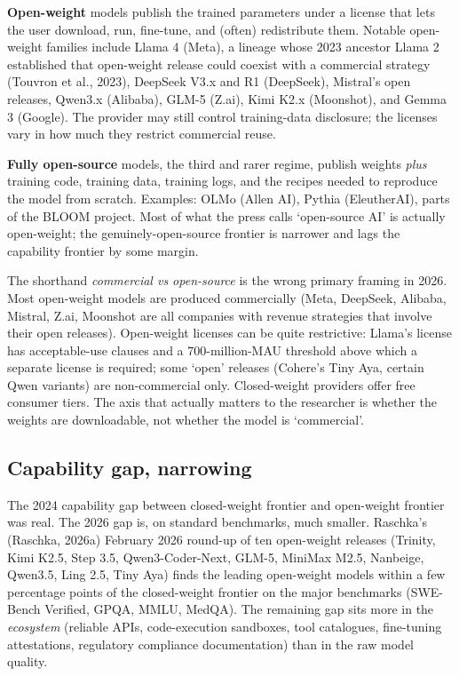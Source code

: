\documentclass[
  letterpaper,
  11pt]{scrbook}
\begin{document}
\textbf{Open-weight} models publish the trained parameters under a
license that lets the user download, run, fine-tune, and (often)
redistribute them. Notable open-weight families include Llama 4 (Meta),
a lineage whose 2023 ancestor Llama 2 established that open-weight
release could coexist with a commercial strategy ({Touvron et al.},
2023), DeepSeek V3.x and R1 (DeepSeek), Mistral's open releases, Qwen3.x
(Alibaba), GLM-5 (Z.ai), Kimi K2.x (Moonshot), and Gemma 3 (Google). The
provider may still control training-data disclosure; the licenses vary
in how much they restrict commercial reuse.

\textbf{Fully open-source} models, the third and rarer regime, publish
weights \emph{plus} training code, training data, training logs, and the
recipes needed to reproduce the model from scratch. Examples: OLMo
(Allen AI), Pythia (EleutherAI), parts of the BLOOM project. Most of
what the press calls `open-source AI' is actually open-weight; the
genuinely-open-source frontier is narrower and lags the capability
frontier by some margin.

The shorthand \emph{commercial vs open-source} is the wrong primary
framing in 2026. Most open-weight models are produced commercially
(Meta, DeepSeek, Alibaba, Mistral, Z.ai, Moonshot are all companies with
revenue strategies that involve their open releases). Open-weight
licenses can be quite restrictive: Llama's license has acceptable-use
clauses and a 700-million-MAU threshold above which a separate license
is required; some `open' releases (Cohere's Tiny Aya, certain Qwen
variants) are non-commercial only. Closed-weight providers offer free
consumer tiers. The axis that actually matters to the researcher is
whether the weights are downloadable, not whether the model is
`commercial'.

\subsection{Capability gap, narrowing}\label{capability-gap-narrowing}

The 2024 capability gap between closed-weight frontier and open-weight
frontier was real. The 2026 gap is, on standard benchmarks, much
smaller. Raschka's (Raschka, 2026a) February 2026 round-up of ten
open-weight releases (Trinity, Kimi K2.5, Step 3.5, Qwen3-Coder-Next,
GLM-5, MiniMax M2.5, Nanbeige, Qwen3.5, Ling 2.5, Tiny Aya) finds the
leading open-weight models within a few percentage points of the
closed-weight frontier on the major benchmarks (SWE-Bench Verified,
GPQA, MMLU, MedQA). The remaining gap sits more in the \emph{ecosystem}
(reliable APIs, code-execution sandboxes, tool catalogues, fine-tuning
attestations, regulatory compliance documentation) than in the raw model
quality.
\end{document}
